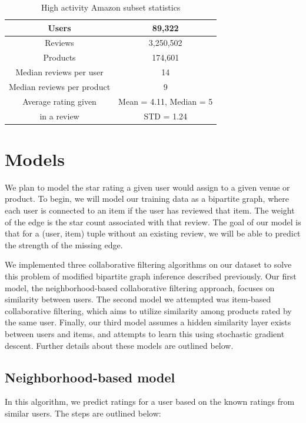 \documentclass[letterpaper, 11 pt, conference]{ieeeconf}
\begin{document}
\begin{table}[htb]
\centering
\begin{tabular}{|c|c|}
\hline
Users & 89,322 \tabularnewline \hline
Reviews & 3,250,502 \tabularnewline \hline
Products & 174,601 \tabularnewline \hline
Median reviews per user & 14
\tabularnewline \hline
Median reviews per product & 9
\tabularnewline \hline
Average rating given &Mean = 4.11, Median = 5 \tabularnewline
in a review &STD = 1.24
\tabularnewline \hline

\end{tabular}
\caption{ High activity Amazon subset statistics }
\label{table:amazonstats_sub}
\end{table}


\section{Models}
\label{sec:models}

We plan to model the star rating a given user would assign to a given
venue or product. To begin, we will model our training data as a bipartite
graph, where each user is connected to an item if the user has reviewed
that item. The weight of the edge is the star count associated with that
review. The goal of our model is that for a (user, item) tuple without an
existing review, we will be able to predict the strength of the missing
edge.

We implemented three collaborative filtering algorithms on our dataset to
solve this problem of modified bipartite graph inference described
previously. Our first model, the neighborhood-based collaborative
filtering approach, focuses on similarity between users. The second model
we attempted was item-based collaborative filtering, which aims to utilize
similarity among products rated by the same user. Finally, our third model
assumes a hidden similarity layer exists between users and items, and
attempts to learn this using stochastic gradient descent. Further details
about these models are outlined below.

\subsection{Neighborhood-based model}

In this algorithm, we predict ratings for a user based on the known
ratings from similar users. The steps are outlined below:
\end{document}
